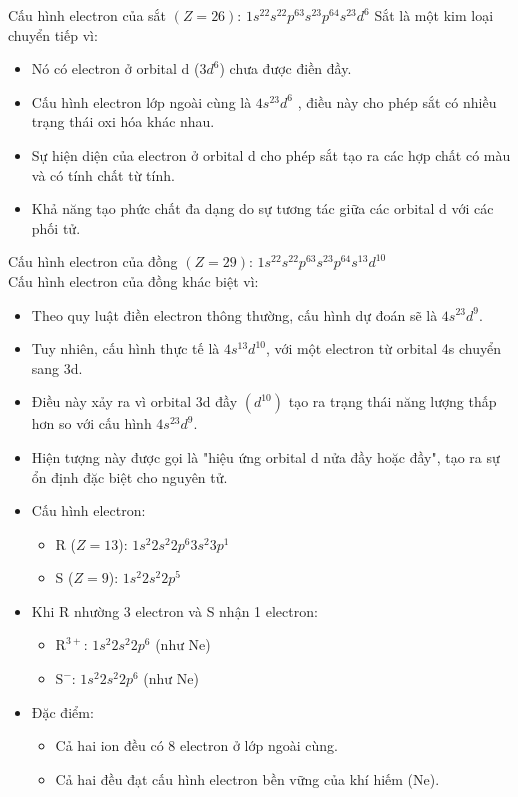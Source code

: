 \begin{loigiaibth}{1}
  Cấu hình electron của sắt $(Z=26)$: $1s^22s^22p^63s^23p^64s^23d^6$ Sắt là một kim loại chuyển tiếp vì: \begin {itemize} \item Nó có electron ở orbital d ($3d^6$) chưa được điền đầy. \item Cấu hình electron lớp ngoài cùng là $4s^23d^6$ , điều này cho phép sắt có nhiều trạng thái oxi hóa khác nhau. \item Sự hiện diện của electron ở orbital d cho phép sắt tạo ra các hợp chất có màu và có tính chất từ tính. \item Khả năng tạo phức chất đa dạng do sự tương tác giữa các orbital d với các phối tử. \end {itemize}
\end{loigiaibth}
\begin{loigiaibth}{2}
  Cấu hình electron của đồng $(Z=29)$: $1s^22s^22p^63s^23p^64s^13d^{10}$ \\ Cấu hình electron của đồng khác biệt vì: \begin {itemize} \item Theo quy luật điền electron thông thường, cấu hình dự đoán sẽ là $4s^23d^9$. \item Tuy nhiên, cấu hình thực tế là $4s^13d^{10}$, với một electron từ orbital 4s chuyển sang 3d. \item Điều này xảy ra vì orbital 3d đầy $(d^{10})$ tạo ra trạng thái năng lượng thấp hơn so với cấu hình $4s^23d^9$. \item Hiện tượng này được gọi là "hiệu ứng orbital d nửa đầy hoặc đầy", tạo ra sự ổn định đặc biệt cho nguyên tử. \end {itemize}
\end{loigiaibth}
\begin{loigiaibth}{3}
  \begin {itemize} \item Cấu hình electron: \begin {itemize} \item R ($Z=13$): $1s^2 2s^2 2p^6 3s^2 3p^1$ \item S ($Z=9$): $1s^2 2s^2 2p^5$ \end {itemize} \item Khi R nhường 3 electron và S nhận 1 electron: \begin {itemize} \item $\text {R}^{3+}$: $1s^2 2s^2 2p^6$ (như Ne) \item $\text {S}^-$: $1s^2 2s^2 2p^6$ (như Ne) \end {itemize} \item Đặc điểm: \begin {itemize} \item Cả hai ion đều có 8 electron ở lớp ngoài cùng. \item Cả hai đều đạt cấu hình electron bền vững của khí hiếm (Ne). \end {itemize} \end {itemize}
\end{loigiaibth}
